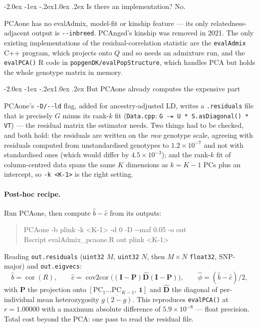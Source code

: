 \documentclass[10pt,a4paper]{article}
\makeatletter
\renewcommand\subsection{\@startsection{subsection}{2}{\z@}%
  {-2.0ex \@plus -1ex \@minus -.2ex}{1.0ex \@plus.2ex}%
  {\normalfont\normalsize\bfseries\color{hdr}}}
\makeatother
\begin{document}
\subsection{Is there an implementation? No.}

PCAone has no evalAdmix, model-fit or kinship feature --- its only relatedness-adjacent output is
\texttt{-{}-inbreed}. PCAngsd's kinship was removed in 2021. The only existing implementations of the
residual-correlation statistic are the \texttt{evalAdmix} C++ program, which projects onto $Q$ and so needs an
admixture run, and the \texttt{evalPCA()} R code in \texttt{popgenDK/evalPopStructure}, which handles PCA but
holds the whole genotype matrix in memory.

\subsection{But PCAone already computes the expensive part}

PCAone's \texttt{-D/-{}-ld} flag, added for ancestry-adjusted LD, writes a \texttt{.residuals} file that is
precisely $G$ minus its rank-$k$ fit (\texttt{Data.cpp}: \texttt{G -= U * S.asDiagonal() * VT}) --- the
residual matrix the estimator needs. Two things had to be checked, and both hold: the residuals are written
on the \emph{raw} genotype scale, agreeing with residuals computed from unstandardised genotypes to
$1.2\times10^{-7}$ and not with standardised ones (which would differ by $4.5\times10^{-3}$); and the rank-$k$
fit of column-centred data spans the same $K$ dimensions as $k=K-1$ PCs plus an intercept, so
\texttt{-k <K-1>} is the right setting.

\paragraph{Post-hoc recipe.} Run PCAone, then compute $\hat b-\hat c$ from its outputs:
\begin{quote}\ttfamily\small
PCAone -b plink -k <K-1> -d 0 -D -{}-maf 0.05 -o out\\
Rscript evalAdmix\_pcaone.R out plink <K-1>
\end{quote}
Reading \texttt{out.residuals} (\texttt{uint32} $M$, \texttt{uint32} $N$, then $M\times N$ \texttt{float32},
SNP-major) and \texttt{out.eigvecs}:
\begin{equation*}
\hat b = \operatorname{cor}(R),\qquad
\hat c = \operatorname{cov2cor}\!\big((\mathbf{I}-\mathbf{P})\hat{\mathbf{D}}(\mathbf{I}-\mathbf{P})\big),
\qquad \hat\phi = (\hat b-\hat c)/2,
\end{equation*}
with $\mathbf{P}$ the projection onto $[\text{PC}_1\ldots\text{PC}_{K-1},\,\mathbf 1]$ and
$\hat{\mathbf D}$ the diagonal of per-individual mean heterozygosity $\overline{g(2-g)}$. This reproduces
\texttt{evalPCA()} at $r=1.00000$ with a maximum absolute difference of $5.9\times10^{-8}$ --- float
precision. Total cost beyond the PCA: one pass to read the residual file.
\end{document}
